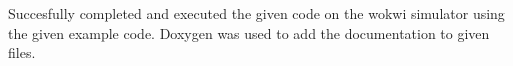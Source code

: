 Succesfully completed and executed the given code on the wokwi simulator using the given example code. Doxygen was used to add the documentation to given files. 
